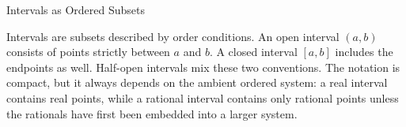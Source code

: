 \label{sec:real-line-intervals-as-ordered-subsets}

\begin{topicbox}{Intervals as Ordered Subsets}
\begin{exposition}
Intervals are subsets described by order conditions. An open interval
\((a,b)\) consists of points strictly between \(a\) and \(b\). A closed
interval \([a,b]\) includes the endpoints as well. Half-open intervals mix
these two conventions. The notation is compact, but it always depends on the
ambient ordered system: a real interval contains real points, while a rational
interval contains only rational points unless the rationals have first been
embedded into a larger system.
\end{exposition}
\end{topicbox}

